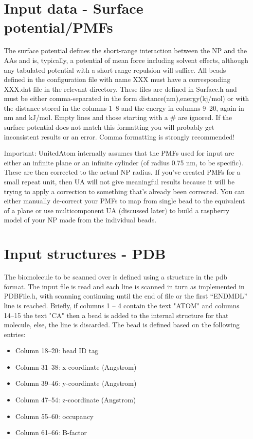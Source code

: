 \documentclass[10pt,a4paper,onecolumn]{report}
\begin{document}
\section{Input data - Surface potential/PMFs}
The surface potential defines the short-range interaction between the NP and the AAs and is, typically, a potential of mean force including solvent effects, although any tabulated potential with a short-range repulsion will suffice. All beads defined in the configuration file with name XXX must have a corresponding XXX.dat file in the relevant directory. These files are defined in Surface.h and must be either comma-separated in the form distance(nm),energy(kj/mol) or with the distance stored in the columns 1--8 and the energy in columns 9--20, again in nm and kJ/mol. Empty lines and those starting with a \# are ignored. If the surface potential does not match this formatting you will probably get inconsistent results or an error. Comma formatting is strongly recommended! 

Important: UnitedAtom internally assumes that the PMFs used for input are either an infinite plane or an infinite cylinder (of radius 0.75 nm, to be specific). These are then corrected to the actual NP radius. If you've created PMFs for a small repeat unit, then UA will not give meaningful results because it will be trying to apply a correction to something that's already been corrected. You can either manually de-correct your PMFs to map from single bead to the equivalent of a plane or use multicomponent UA (discussed later) to build a raspberry model of your NP made from the individual beads. 

\section{Input structures - PDB}
The biomolecule to be scanned over is defined using a structure in the pdb format. The input file is read and each line is scanned in turn as implemented in PDBFile.h, with scanning continuing until the end of file or the first ``ENDMDL'' line is reached. Briefly, if columns 1 -- 4 contain the text "ATOM" and columns 14--15 the text "CA" then a bead is added to the internal structure for that molecule, else, the line is discarded.  The bead is defined based on the following entries:
\begin{itemize}
\item Column 18--20: bead ID tag
\item Column 31--38: x-coordinate (Angstrom)
\item Column 39--46: y-coordinate (Angstrom)
\item Column 47--54: z-coordinate (Angstrom)
\item Column 55--60: occupancy
\item Column 61--66: B-factor
\end{itemize}
\end{document}
